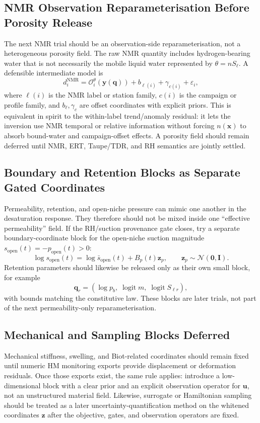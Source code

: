 \documentclass[10pt,a4paper]{article}
\newcommand{\uu}{\bm{u}}
\newcommand{\I}{\bm{I}}
\newcommand{\npor}{n}
\newcommand{\Sat}{S_\ell}
\newcommand{\thetaw}{\theta}
\newcommand{\Oop}{\mathcal O}
\begin{document}
\subsection{NMR Observation Reparameterisation Before Porosity Release}

The next NMR trial should be an observation-side reparameterisation, not a
heterogeneous porosity field.  The raw NMR quantity includes hydrogen-bearing water
that is not necessarily the mobile liquid water represented by
\(\thetaw=\npor\Sat\).  A defensible intermediate model is
\[
  d_i^{\mathrm{NMR}}
  =
  \Oop_i^\theta(\bm y(\bm q))
  + b_{\ell(i)}+\gamma_{c(i)}
  +\varepsilon_i ,
\]
where \(\ell(i)\) is the NMR label or station family, \(c(i)\) is the campaign or
profile family, and \(b_\ell,\gamma_c\) are offset coordinates with explicit
priors.  This is equivalent in spirit to the within-label trend/anomaly residual:
it lets the inversion use NMR temporal or relative information without forcing
\(\npor(\bm x)\) to absorb bound-water and campaign-offset effects.  A porosity
field should remain deferred until NMR, ERT, Taupe/TDR, and RH semantics are
jointly settled.

\subsection{Boundary and Retention Blocks as Separate Gated Coordinates}

Permeability, retention, and open-niche pressure can mimic one another in the
desaturation response.  They therefore should not be mixed inside one
``effective permeability'' field.  If the RH/suction provenance gate closes, try a
separate boundary-coordinate block for the open-niche suction magnitude
\(s_{\mathrm{open}}(t)=-p_{\mathrm{open}}(t)>0\):
\[
  \log s_{\mathrm{open}}(t)
  =
  \log \bar s_{\mathrm{open}}(t)+B_p(t)\bm z_p,
  \qquad \bm z_p\sim\mathcal N(\bm{0},\I).
\]
Retention parameters should likewise be released only as their own small block,
for example
\[
  \bm q_r=
  \left(\log p_b,\;
  \operatorname{logit} m,\;
  \operatorname{logit} S_{\ell r}\right),
\]
with bounds matching the constitutive law.  These blocks are later trials, not
part of the next permeability-only reparameterisation.

\subsection{Mechanical and Sampling Blocks Deferred}

Mechanical stiffness, swelling, and Biot-related coordinates should remain fixed
until numeric HM monitoring exports provide displacement or deformation residuals.
Once those exports exist, the same rule applies: introduce a low-dimensional block
with a clear prior and an explicit observation operator for \(\uu\), not an
unstructured material field.  Likewise, surrogate or Hamiltonian sampling should be
treated as a later uncertainty-quantification method on the whitened coordinates
\(\bm z\) after the objective, gates, and observation operators are fixed.
\end{document}
